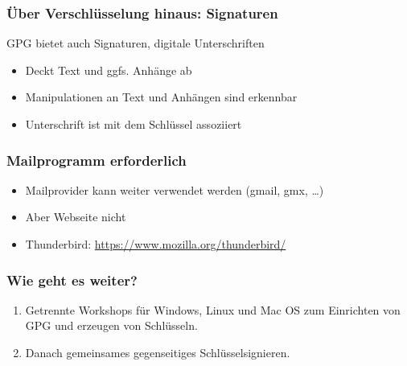 \documentclass{beamer}
\begin{document}
\begin{frame}
  \frametitle{Über Verschlüsselung hinaus: Signaturen}
  GPG bietet auch Signaturen, digitale Unterschriften
  \begin{itemize}
  \item Deckt Text und ggfs. Anhänge ab
  \item Manipulationen an Text und Anhängen sind erkennbar
  \item Unterschrift ist mit dem Schlüssel assoziiert
  \end{itemize}
\end{frame}

\begin{frame}
  \frametitle{Mailprogramm erforderlich}
  \begin{itemize}
  \item Mailprovider kann weiter verwendet werden (gmail, gmx, …)
  \item Aber Webseite nicht
  \item Thunderbird: \url{https://www.mozilla.org/thunderbird/}
  \end{itemize}
\end{frame}

\begin{frame}
  \frametitle{Wie geht es weiter?}
  \begin{enumerate}
  \item Getrennte Workshops für Windows, Linux und Mac OS zum Einrichten von
    GPG und erzeugen von Schlüsseln.
  \item Danach gemeinsames gegenseitiges Schlüsselsignieren.
  \end{enumerate}
\end{frame}
\end{document}
